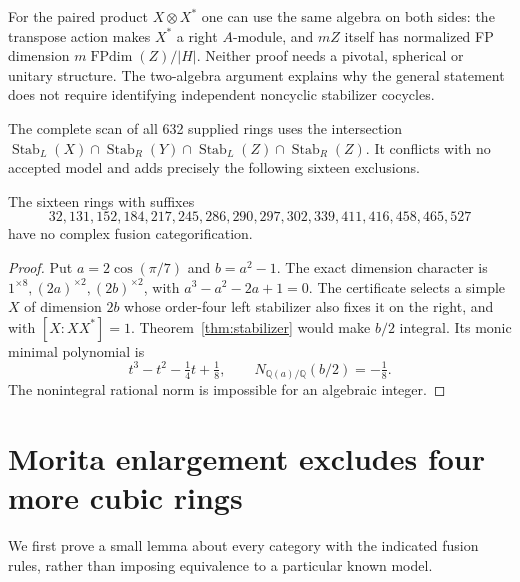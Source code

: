 \documentclass[11pt]{article}
\newcommand{\FPdim}{\operatorname{FPdim}}\renewcommand{\Vec}{\operatorname{Vec}}\newcommand{\Rep}{\operatorname{Rep}}\newcommand{\Irr}{\operatorname{Irr}}
\begin{document}
For the paired product $X\otimes X^*$ one can use the same algebra on both sides:
the transpose action makes $X^*$ a right $A$-module, and $mZ$ itself has normalized
FP dimension $m\FPdim(Z)/|H|$. Neither proof needs a pivotal, spherical or unitary
structure. The two-algebra argument explains why the general statement does not
require identifying independent noncyclic stabilizer cocycles.

The complete scan of all 632 supplied rings uses the intersection
$\operatorname{Stab}_L(X)\cap\operatorname{Stab}_R(Y)\cap
\operatorname{Stab}_L(Z)\cap\operatorname{Stab}_R(Z)$.
It conflicts with no accepted model and adds precisely the following sixteen exclusions.

\begin{proposition}
The sixteen rings with suffixes
\[
32,131,152,184,217,245,286,290,297,302,339,411,416,458,465,527
\]
have no complex fusion categorification.
\end{proposition}
\begin{proof}
Put $a=2\cos(\pi/7)$ and $b=a^2-1$. The exact dimension character is
$1^{\times8},(2a)^{\times2},(2b)^{\times2}$, with
$a^3-a^2-2a+1=0$. The certificate selects a simple $X$ of dimension $2b$ whose
order-four left stabilizer also fixes it on the right, and with $[X:X X^*]=1$.
Theorem~\ref{thm:stabilizer} would make $b/2$ integral. Its monic minimal polynomial is
\[
 t^3-t^2-\tfrac14t+\tfrac18,
 \qquad N_{\mathbb Q(a)/\mathbb Q}(b/2)=-\tfrac18.
\]
The nonintegral rational norm is impossible for an algebraic integer.
\end{proof}

\section{Morita enlargement excludes four more cubic rings}
We first prove a small lemma about every category with the indicated fusion rules,
rather than imposing equivalence to a particular known model.
\end{document}
